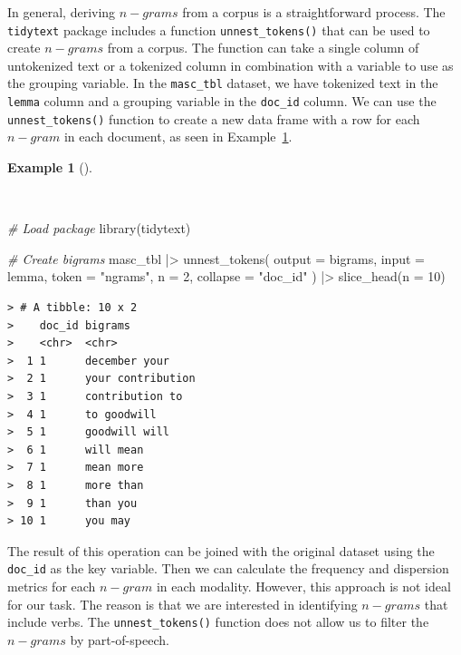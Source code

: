 \documentclass[
  letterpaper,
  DIV=11,
  numbers=noendperiod]{scrreport}
\newenvironment{Shaded}{\begin{snugshade}}{\end{snugshade}}
\newcommand{\AttributeTok}[1]{\textcolor[rgb]{0.00,0.00,0.00}{#1}}
\newcommand{\CommentTok}[1]{\textcolor[rgb]{0.00,0.00,0.00}{\textit{#1}}}
\newcommand{\DecValTok}[1]{\textcolor[rgb]{0.00,0.00,0.00}{#1}}
\newcommand{\FunctionTok}[1]{\textcolor[rgb]{0.00,0.00,0.00}{#1}}
\newcommand{\NormalTok}[1]{\textcolor[rgb]{0.00,0.00,0.00}{#1}}
\newcommand{\SpecialCharTok}[1]{\textcolor[rgb]{0.00,0.00,0.00}{#1}}
\newcommand{\StringTok}[1]{\textcolor[rgb]{0.00,0.00,0.00}{#1}}
\theoremstyle{definition}
\newtheorem{example}{Example}[chapter]
\theoremstyle{remark}
\begin{document}
In general, deriving \(n-grams\) from a corpus is a straightforward
process. The \texttt{tidytext} package includes a function
\texttt{unnest\_tokens()} that can be used to create \(n-grams\) from a
corpus. The function can take a single column of untokenized text or a
tokenized column in combination with a variable to use as the grouping
variable. In the \texttt{masc\_tbl} dataset, we have tokenized text in
the \texttt{lemma} column and a grouping variable in the
\texttt{doc\_id} column. We can use the \texttt{unnest\_tokens()}
function to create a new data frame with a row for each \(n-gram\) in
each document, as seen in Example~\ref{exm-eda-masc-bigrams-tidytext}.

\begin{example}[]\protect\hypertarget{exm-eda-masc-bigrams-tidytext}{}\label{exm-eda-masc-bigrams-tidytext}

~

\begin{Shaded}
\begin{Highlighting}[]
\CommentTok{\# Load package}
\FunctionTok{library}\NormalTok{(tidytext)}

\CommentTok{\# Create bigrams}
\NormalTok{masc\_tbl }\SpecialCharTok{|\textgreater{}} 
  \FunctionTok{unnest\_tokens}\NormalTok{(}
    \AttributeTok{output =}\NormalTok{ bigrams, }
    \AttributeTok{input =}\NormalTok{ lemma, }
    \AttributeTok{token =} \StringTok{"ngrams"}\NormalTok{, }
    \AttributeTok{n =} \DecValTok{2}\NormalTok{, }
    \AttributeTok{collapse =} \StringTok{"doc\_id"}
\NormalTok{    ) }\SpecialCharTok{|\textgreater{}} 
  \FunctionTok{slice\_head}\NormalTok{(}\AttributeTok{n =} \DecValTok{10}\NormalTok{)}
\end{Highlighting}
\end{Shaded}

\begin{verbatim}
> # A tibble: 10 x 2
>    doc_id bigrams          
>    <chr>  <chr>            
>  1 1      december your    
>  2 1      your contribution
>  3 1      contribution to  
>  4 1      to goodwill      
>  5 1      goodwill will    
>  6 1      will mean        
>  7 1      mean more        
>  8 1      more than        
>  9 1      than you         
> 10 1      you may
\end{verbatim}

\end{example}

The result of this operation can be joined with the original dataset
using the \texttt{doc\_id} as the key variable. Then we can calculate
the frequency and dispersion metrics for each \(n-gram\) in each
modality. However, this approach is not ideal for our task. The reason
is that we are interested in identifying \(n-grams\) that include verbs.
The \texttt{unnest\_tokens()} function does not allow us to filter the
\(n-grams\) by part-of-speech.
\end{document}
